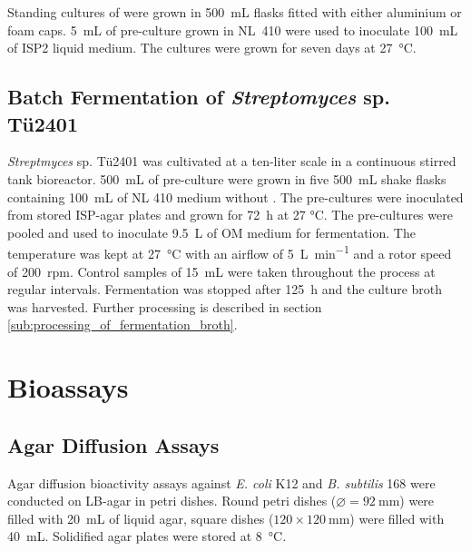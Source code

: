 		Standing cultures of \tue were grown in \SI{500}{\milli\liter} flasks fitted with either aluminium or foam caps. \SI{5}{\milli\liter} of pre-culture grown in NL~410 were used to inoculate \SI{100}{\milli\liter} of ISP2 liquid medium. The cultures were grown for seven days at \SI{27}{\celsius}.
	
	
	\subsection{Batch Fermentation of \emph{Streptomyces} sp. Tü2401} %
	\label{sub:fermentation}
	\textit{Streptmyces} sp. Tü2401 was cultivated at a ten-liter scale in a continuous stirred tank bioreactor. \SI{500}{\milli\liter} of pre-culture were grown in five \SI{500}{\milli\liter} shake flasks containing \SI{100}{\milli\liter} of NL 410 medium without . The pre-cultures were inoculated from stored ISP-agar plates and grown for \SI{72}{\hour} at 27 \si{\celsius}. The pre-cultures were pooled and used to inoculate \SI{9.5}{\liter} of OM medium for fermentation. The temperature was kept at \SI{27}{\celsius} with an airflow of \SI{5}{\liter\per\minute} and a rotor speed of 200~rpm. Control samples of \SI{15}{\milli\liter} were taken throughout the process at regular intervals. Fermentation was stopped after \SI{125}{\hour} and the culture broth was harvested. Further processing is described in section \ref{sub:processing_of_fermentation_broth}.



\section{Bioassays} %
\label{sec:bioassays}

	\subsection{Agar Diffusion Assays} %
	\label{sub:agar_diffusion_bioactivity_assays}

	Agar diffusion bioactivity assays against \emph{E. coli} K12 and \emph{B. subtilis} 168 were conducted on LB-agar in petri dishes. Round petri dishes ($\varnothing=\SI{92}{\milli\meter}$) were filled with \SI{20}{\milli\liter} of liquid agar, square dishes ($120\times \SI{120}{\milli\meter}$) were filled with \SI{40}{\milli\liter}. Solidified agar plates were stored at \SI{8}{\celsius}.

